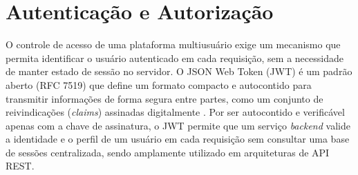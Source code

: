 

\section{Autenticação e Autorização}

\par O controle de acesso de uma plataforma multiusuário exige um mecanismo que permita identificar o usuário autenticado em cada requisição, sem a necessidade de manter estado de sessão no servidor. O JSON Web Token (JWT) é um padrão aberto (RFC 7519) que define um formato compacto e autocontido para transmitir informações de forma segura entre partes, como um conjunto de reivindicações (\textit{claims}) assinadas digitalmente \cite{jwtRfc:online}. Por ser autocontido e verificável apenas com a chave de assinatura, o JWT permite que um serviço \textit{backend} valide a identidade e o perfil de um usuário em cada requisição sem consultar uma base de sessões centralizada, sendo amplamente utilizado em arquiteturas de API REST.
